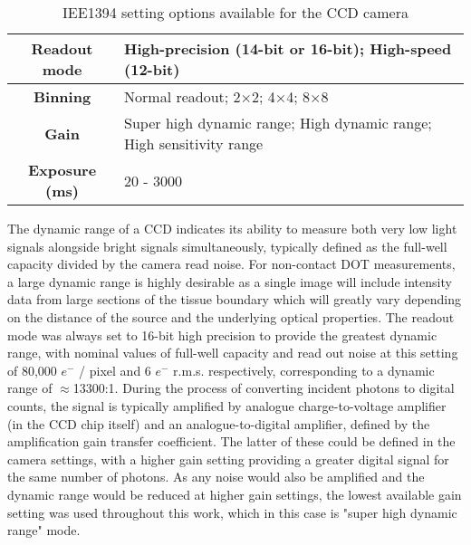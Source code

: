 \documentclass[twoside]{bhamthesis}
\theoremstyle{definition}
\begin{document}
\bgroup
\def\arraystretch{1.2}
\begin{table}[!ht]
\begin{center}
\small
 \begin{tabular}{|c| l|}
  \hline
\textbf{Readout mode} & High-precision (14-bit or 16-bit);  High-speed (12-bit)\\ 
 \hline
\textbf{ Binning}  & Normal readout;  2$\times$2;  4$\times$4;  8$\times$8 \\ 
 \hline
\textbf{Gain} & Super high dynamic range;  High dynamic range;  High sensitivity range \\
 \hline
\textbf{ Exposure (ms)} & 20 - 3000 \\
 \hline
\end{tabular}
\caption{IEE1394 setting options available for the CCD camera}
\label{tab:OpticalPropertiesTable}
\end{center}
\end{table}
\egroup

The dynamic range of a CCD indicates its ability to measure both very low light signals alongside bright signals simultaneously, typically defined as the full-well capacity divided by the camera read noise. For non-contact DOT measurements, a large dynamic range is highly desirable as a single image will include intensity data from large sections of the tissue boundary which will greatly vary depending on the distance of the source and the underlying optical properties. The readout mode was always set to 16-bit high precision to provide the greatest dynamic range, with nominal values of full-well capacity and read out noise at this setting of 80,000 $e^{-}$ / pixel and 6 $e^{-}$ r.m.s. respectively, corresponding to a dynamic range of $\approx$13300:1. During the process of converting incident photons to digital counts, the signal is typically amplified by analogue charge-to-voltage amplifier (in the CCD chip itself) and an analogue-to-digital amplifier, defined by the amplification gain transfer coefficient. The latter of these could be defined in the camera settings, with a higher gain setting providing a greater digital signal for the same number of photons. As any noise would also be amplified and the dynamic range would be reduced at higher gain settings, the lowest available gain setting was used throughout this work, which in this case is "super high dynamic range" mode.
\end{document}
